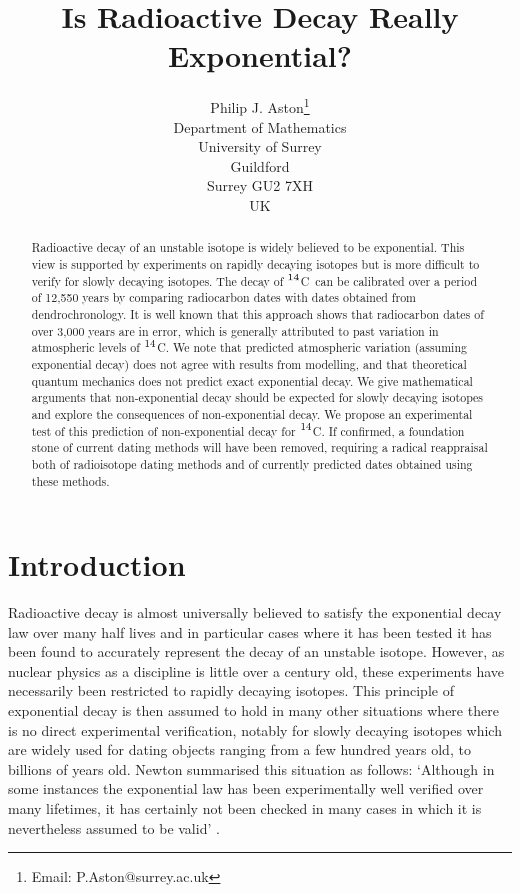 \documentclass[12pt]{article}
\title{\vspace{-6mm}Is Radioactive Decay Really Exponential?
\vspace{-2mm}
}
\author{Philip J. Aston\thanks{Email: P.Aston@surrey.ac.uk}\\
Department of Mathematics\\
University of Surrey\\
Guildford\\
Surrey GU2 7XH\\
UK}
\newcommand{\cft}{$^{\rm 14}$C}
\begin{document}
\maketitle

\begin{abstract}
Radioactive decay of an unstable isotope is widely believed to be 
exponential. This view is supported by experiments on rapidly decaying 
isotopes but is more difficult to verify for slowly decaying isotopes. 
The decay of \cft~can be calibrated over a period of 12,550 years by 
comparing radiocarbon dates with dates obtained from
dendrochronology. It is well known that this approach shows that
radiocarbon dates of over 3,000 years are in error, which is generally 
attributed to past variation in atmospheric levels of \cft. We note that
predicted atmospheric variation (assuming exponential decay) does not
agree with results from modelling, and that theoretical quantum mechanics
does not predict exact exponential decay. We give mathematical
arguments that non-exponential decay should be expected for slowly 
decaying isotopes and explore the consequences of non-exponential decay. 
We propose an experimental test of this
prediction of non-exponential decay for \cft. If confirmed, a foundation
stone of current dating methods will have been removed, requiring a 
radical reappraisal both of radioisotope dating methods and of 
currently predicted dates obtained using these methods.
\end{abstract}



\section{Introduction}

Radioactive decay is almost universally believed to satisfy the exponential 
decay law over many half lives and in particular cases where it has been 
tested \cite{gopych84,norman88} it has been found to accurately represent the
decay of an unstable isotope. However, as nuclear physics as a discipline 
is little over a century old, these experiments have necessarily been 
restricted to rapidly decaying isotopes. This principle of exponential decay
is then assumed to hold in many other situations where there is no direct 
experimental verification, notably for slowly decaying isotopes which are 
widely used for dating objects ranging from a few hundred years
old, to billions of years old. Newton summarised this situation as follows:
`Although in some instances the exponential law has been experimentally well
verified over many lifetimes, it has certainly not been checked in many
cases in which it is nevertheless assumed to be valid' \cite[p608]{newton66}.
\end{document}
